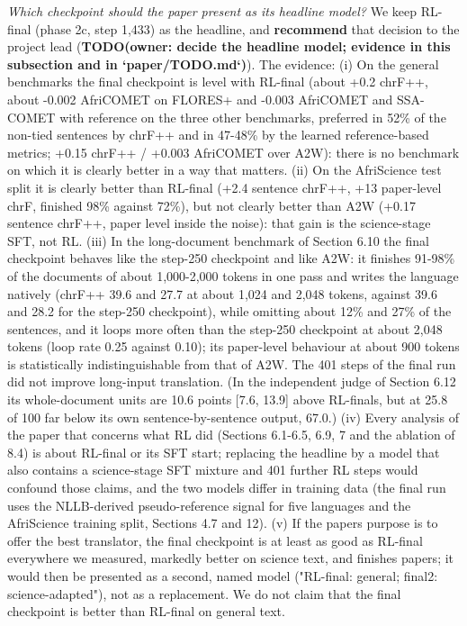 \emph{Which checkpoint should the paper present as its headline model?} We keep RL-final (phase 2c, step 1,433) as the headline, and \textbf{recommend} that decision to the project lead ({\color{red}\textbf{TODO(owner: decide the headline model; evidence in this subsection and in `paper/TODO.md`)}}). The evidence: (i) On the general benchmarks the final checkpoint is level with RL-final (about +0.2 chrF++, about -0.002 AfriCOMET on FLORES+ and -0.003 AfriCOMET and SSA-COMET with reference on the three other benchmarks, preferred in 52\% of the non-tied sentences by chrF++ and in 47-48\% by the learned reference-based metrics; +0.15 chrF++ / +0.003 AfriCOMET over A2W): there is no benchmark on which it is clearly better in a way that matters. (ii) On the AfriScience test split it is clearly better than RL-final (+2.4 sentence chrF++, +13 paper-level chrF, finished 98\% against 72\%), but not clearly better than A2W (+0.17 sentence chrF++, paper level inside the noise): that gain is the science-stage SFT, not RL. (iii) In the long-document benchmark of Section 6.10 the final checkpoint behaves like the step-250 checkpoint and like A2W: it finishes 91-98\% of the documents of about 1,000-2,000 tokens in one pass and writes the language natively (chrF++ 39.6 and 27.7 at about 1,024 and 2,048 tokens, against 39.6 and 28.2 for the step-250 checkpoint), while omitting about 12\% and 27\% of the sentences, and it loops more often than the step-250 checkpoint at about 2,048 tokens (loop rate 0.25 against 0.10); its paper-level behaviour at about 900 tokens is statistically indistinguishable from that of A2W. The 401 steps of the final run did not improve long-input translation. (In the independent judge of Section 6.12 its whole-document units are 10.6 points {[}7.6, 13.9{]} above RL-final\textquotesingle s, but at 25.8 of 100 far below its own sentence-by-sentence output, 67.0.) (iv) Every analysis of the paper that concerns what RL did (Sections 6.1-6.5, 6.9, 7 and the ablation of 8.4) is about RL-final or its SFT start; replacing the headline by a model that also contains a science-stage SFT mixture and 401 further RL steps would confound those claims, and the two models differ in training data (the final run uses the NLLB-derived pseudo-reference signal for five languages and the AfriScience training split, Sections 4.7 and 12). (v) If the paper\textquotesingle s purpose is to offer the best translator, the final checkpoint is at least as good as RL-final everywhere we measured, markedly better on science text, and finishes papers; it would then be presented as a second, named model ("RL-final: general; final2: science-adapted"), not as a replacement. We do not claim that the final checkpoint is better than RL-final on general text.

